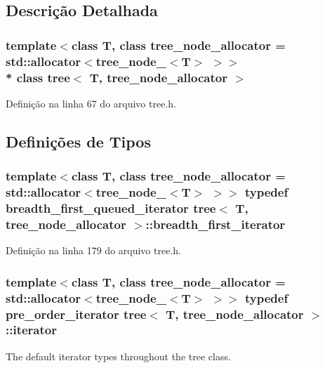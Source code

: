 \subsection{Descrição Detalhada}
\subsubsection*{template$<$class T, class tree\+\_\+node\+\_\+allocator = std\+::allocator$<$tree\+\_\+node\+\_\+$<$\+T$>$ $>$$>$\\*
class tree$<$ T, tree\+\_\+node\+\_\+allocator $>$}



Definição na linha 67 do arquivo tree.\+h.



\subsection{Definições de Tipos}
\subsubsection[{breadth\+\_\+first\+\_\+iterator}]{\setlength{\rightskip}{0pt plus 5cm}template$<$class T, class tree\+\_\+node\+\_\+allocator = std\+::allocator$<$tree\+\_\+node\+\_\+$<$\+T$>$ $>$$>$ typedef {\bf breadth\+\_\+first\+\_\+queued\+\_\+iterator} {\bf tree}$<$ T, tree\+\_\+node\+\_\+allocator $>$\+::{\bf breadth\+\_\+first\+\_\+iterator}}\label{classtree_a5f654926b4f16bd091931a08cc49d4c4}


Definição na linha 179 do arquivo tree.\+h.

\subsubsection[{iterator}]{\setlength{\rightskip}{0pt plus 5cm}template$<$class T, class tree\+\_\+node\+\_\+allocator = std\+::allocator$<$tree\+\_\+node\+\_\+$<$\+T$>$ $>$$>$ typedef {\bf pre\+\_\+order\+\_\+iterator} {\bf tree}$<$ T, tree\+\_\+node\+\_\+allocator $>$\+::{\bf iterator}}\label{classtree_a2079982538b88d21fe1ccea34fe7ce0e}


The default iterator types throughout the tree class. 



